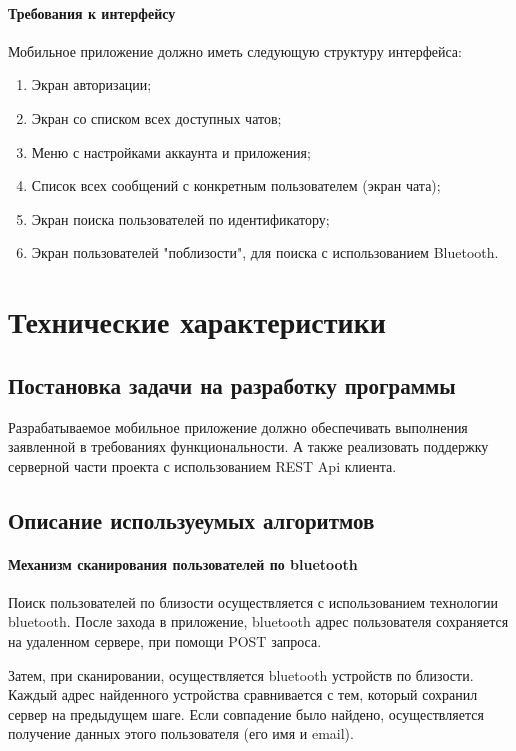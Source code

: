 \documentclass[explnote]{espd}
\begin{document}
\paragraph{Требования к интерфейсу}

Мобильное приложение должно иметь следующую структуру интерфейса:

\begin{enumerate}
\item Экран авторизации;
\item Экран со списком всех доступных чатов;
\item Меню с настройками аккаунта и приложения;
\item Список всех сообщений с конкретным пользователем (экран чата);
\item Экран поиска пользователей по идентификатору;
\item Экран пользователей "поблизости", для поиска с использованием Bluetooth.
\end{enumerate}

\section{Технические характеристики}
\subsection{Постановка задачи на разработку программы}
Разрабатываемое мобильное приложение должно обеспечивать выполнения заявленной в требованиях функциональности. А также реализовать поддержку серверной части проекта с использованием REST Api клиента. 

\subsection{Описание используеумых алгоритмов}
\paragraph{Механизм сканирования пользователей по bluetooth}
Поиск пользователей по близости осуществляется с использованием технологии bluetooth. После захода в приложение, bluetooth адрес пользователя сохраняется на удаленном сервере, при помощи POST запроса.

Затем, при сканировании, осуществляется bluetooth устройств по близости. Каждый адрес найденного устройства сравнивается с тем, который сохранил сервер на предыдущем шаге. Если совпадение было найдено, осуществляется получение данных этого пользователя  (его имя и email).
\end{document}
